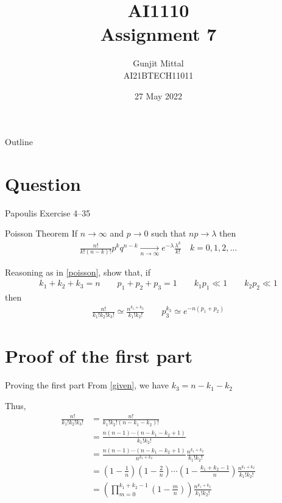 \documentclass{beamer}
\title{AI1110 \\ Assignment 7}
\author{Gunjit Mittal \\ AI21BTECH11011}
\date{27 May 2022}
\providecommand{\brak}[1]{\ensuremath{\left(#1\right)}}
\begin{document}
	\begin{frame}
		\titlepage{}
	\end{frame}
	
	\begin{frame}{Outline}
    		\tableofcontents
	\end{frame}
	
	\section{Question}
	\begin{frame}{Papoulis Exercise 4--35}
	\begin{block}{Poisson Theorem}
		If $n \to \infty$ and $p \to 0$ such that $np \to \lambda$ then 
		\begin{align}
			\label{poisson}
			\frac{n!}{k! (n-k)!} p^k q^{n-k} \xrightarrow[n \to \infty]{} e^{-\lambda} \frac{\lambda^k}{k!} \quad k = 0,1,2,\ldots
		\end{align}
	\end{block}
	
	Reasoning as in \eqref{poisson}, show that, if
	\begin{align}
		\label{given}
		k_1 + k_2 + k_3 = n \qquad p_1 + p_2 + p_3 = 1 \qquad k_1 p_1 \ll 1 \qquad k_2 p_2 \ll 1
	\end{align}
	then
	\begin{align}
		\frac{n!}{k_1! k_2! k_3!} \simeq \frac{n^{k_1 + k_2}}{k_1! k_2!} \qquad p_3^{k_3} \simeq e^{-n(p_1 + p_2)}
	\end{align}
	\end{frame}
	
	\section{Proof of the first part}
	\begin{frame}{Proving the first part}
	From \eqref{given}, we have $k_3 = n - k_1 - k_2$
	
	Thus,
	\begin{align}
		\frac{n!}{k_1! k_2! k_3!} &= \frac{n!}{k_1! k_2! (n - k_1 - k_2)!} \\
		&= \frac{n(n-1) \cdots (n - k_1 - k_2 + 1)}{k_1! k_2!} \\
		&= \frac{n(n-1) \cdots (n - k_1 - k_2 + 1)}{n^{k_1 + k_2}} \frac{n^{k_1 + k_2}}{k_1! k_2!} \\
		&= \brak{1-\frac1n} \brak{1-\frac2n} \cdots \brak{1-\frac{k_1 + k_2 - 1}{n}} \frac{n^{k_1 + k_2}}{k_1! k_2!} \\
		&= \brak{\prod_{m=0}^{k_1 + k_2 - 1} \brak{1 - \frac{m}{n}}} \frac{n^{k_1 + k_2}}{k_1! k_2!}
	\end{align}
	\end{frame}
		
\end{document}
